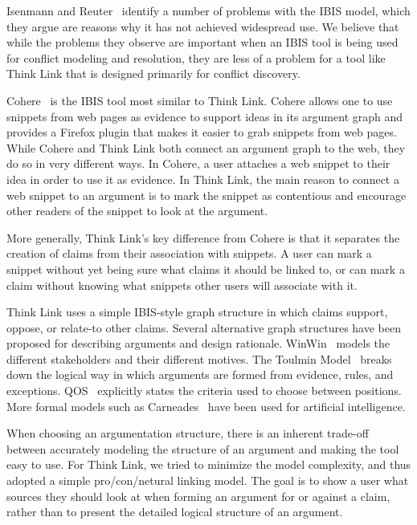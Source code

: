 \documentclass{chi2009}
\begin{document}
Isenmann and Reuter~\cite{Isenmann1997} identify a number of problems with the IBIS model, which they argue are reasons why it has not achieved widespread use.  %
We believe that while the problems they observe are important when an IBIS tool is being used for conflict modeling and resolution, they are less of a problem for a tool like Think Link that is designed primarily for conflict discovery.  %

Cohere~\cite{Shum2008} is the IBIS tool most similar to Think Link.  %
Cohere allows one to use snippets from web pages as evidence to support ideas in its argument graph and provides a Firefox plugin that makes it easier to grab snippets from web pages.  %
While Cohere and Think Link both connect an argument graph to the web, they do so in very different ways. In Cohere, a user attaches a web snippet to their idea in order to use it as evidence. 
In Think Link, the main reason to connect a web snippet to an argument is to mark the snippet as contentious and encourage other readers of the snippet to look at the argument.  %

More generally, Think Link's key difference from Cohere is that it separates the creation of claims from their association with snippets.  %
A user can mark a snippet without yet being sure what claims it should be linked to, or can mark a claim without knowing what snippets other users will associate with it. 

Think Link uses a simple IBIS-style graph structure in which claims support, oppose, or relate-to other claims. Several alternative graph structures have been proposed for describing arguments and design rationale. WinWin~\cite{Boehm2006} models the different stakeholders and their different motives. The Toulmin Model~\cite{toulmin1958} breaks down the logical way in which arguments are formed from evidence, rules, and exceptions. QOS~\cite{Maclean1991} explicitly states the criteria used to choose between positions. More formal models such as Carneades~\cite{Gordon2007} have been used for artificial intelligence.

When choosing an argumentation structure, there is an inherent trade-off between accurately modeling the structure of an argument and making the tool easy to use.  %
For Think Link, we tried to minimize the model complexity, and thus adopted a simple pro/con/netural linking model.  %
The goal is to show a user what sources they should look at when forming an argument for or against a claim, rather than to present the detailed logical structure of an argument.  %
\end{document}
